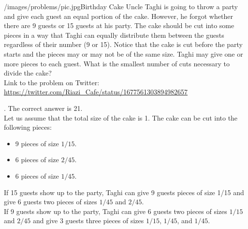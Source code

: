 \begin{problem}{/images/problems/pic.jpg}{Birthday Cake}
    Uncle Taghi is going to throw a party and give each guest an equal portion of the cake. However, he forgot whether there are 9 guests or 15 guests at his party. The cake should be cut into some pieces in a way that Taghi can equally distribute them between the guests regardless of their number (9 or 15). Notice that the cake is cut before the party starts and the pieces may or may not be of the same size. Taghi may give one or more pieces to each guest. What is the smallest number of cuts necessary to divide the cake?\\[0.2cm]

Link to the problem on Twitter:  \url{https://twitter.com/Riazi_Cafe/status/1677561303894982657}
\end{problem}
\begin{solution}.
The correct answer is 21.\\[0.2cm]

Let us assume that the total size of the cake is 1. The cake can be cut into the following pieces:
\begin{itemize}
\item 9 pieces of size $1/15$.
\item 6 pieces of size $2/45$.
\item 6 pieces of size $1/45$.
\end{itemize}

If 15 guests show up to the party, Taghi can give 9 guests pieces of size  1/15 and give 6 guests two pieces of sizes $1/45$ and $2/45$.\\
If 9 guests show up to the party, Taghi can give 6 guests two pieces of sizes  $1/15$ and $2/45$ and give 3 guests three pieces of sizes $1/15$, $1/45$, and $1/45$.


\end{solution}